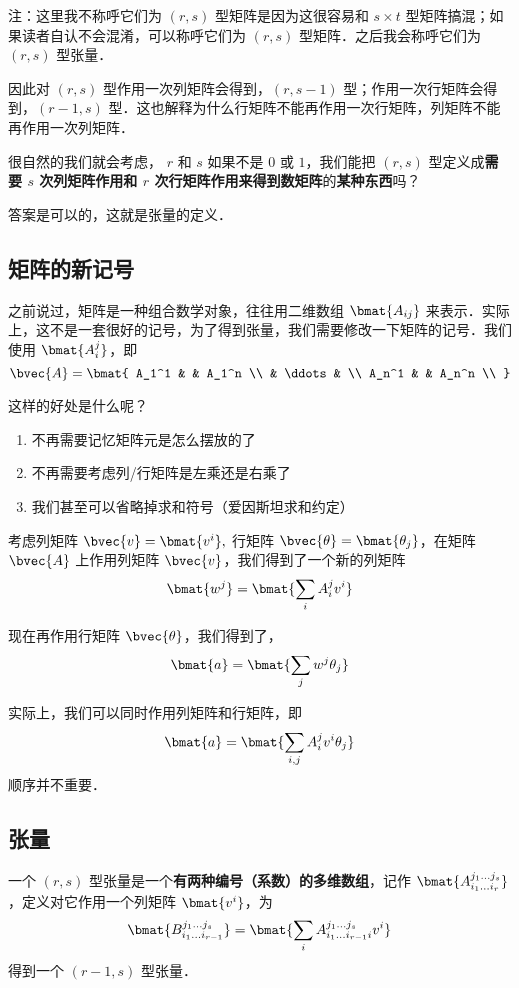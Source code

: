 注：这里我不称呼它们为 $(r, s)$ 型矩阵是因为这很容易和 $s \times t$ 型矩阵搞混；如果读者自认不会混淆，可以称呼它们为 $(r, s)$ 型矩阵．之后我会称呼它们为$(r, s)$ 型张量．

因此对 $(r, s)$ 型作用一次列矩阵会得到，$(r, s - 1)$ 型；作用一次行矩阵会得到，$(r - 1, s)$ 型．这也解释为什么行矩阵不能再作用一次行矩阵，列矩阵不能再作用一次列矩阵．

很自然的我们就会考虑， $r$ 和 $s$ 如果不是 $0$ 或 $1$，我们能把 $(r, s)$ 型定义成\textbf{需要 $s$ 次列矩阵作用和 $r$ 次行矩阵作用来得到数矩阵}的\textbf{某种东西}吗？

答案是可以的，这就是张量的定义．

\subsection{矩阵的新记号}

之前说过，矩阵是一种组合数学对象，往往用二维数组 $\bmat{A_{i j}}$ 来表示．实际上，这不是一套很好的记号，为了得到张量，我们需要修改一下矩阵的记号．我们使用 $\bmat{A_i^j}$，即
$$
\bvec{A} = \bmat{
A_1^1 &  & A_1^n \\
 & \ddots & \\
A_n^1 &  & A_n^n \\
}
$$

这样的好处是什么呢？
\begin{enumerate}
\item 不再需要记忆矩阵元是怎么摆放的了
\item 不再需要考虑列/行矩阵是左乘还是右乘了
\item 我们甚至可以省略掉求和符号（爱因斯坦求和约定）
\end{enumerate}


考虑列矩阵 $\bvec{v} = \bmat{v^i},$ 行矩阵 $\bvec{\theta} = \bmat{\theta_j}$，在矩阵 $\bvec{A}$ 上作用列矩阵 $\bvec{v}$，我们得到了一个新的列矩阵
$$
\bmat{w^j} = \bmat{\sum_i A_i^j v^i}
$$

现在再作用行矩阵 $\bvec{\theta}$，我们得到了，
$$
\bmat{a} = \bmat{\sum_j w^j \theta_j}
$$

实际上，我们可以同时作用列矩阵和行矩阵，即
$$
\bmat{a} = \bmat{\sum_{i, j} A_i^j v^i \theta_j}
$$
顺序并不重要．

\subsection{张量}

一个 $(r,s)$ 型张量是一个\textbf{有两种编号（系数）的多维数组}，记作 $\bmat{A_{i_1 \dots i_r}^{j_1 \dots j_s}}$，定义对它作用一个列矩阵 $\bmat{v^{i}}$，为
\begin{equation}\label{TsrFst_eq1}
\bmat{B_{i_1 \dots i_{r - 1}}^{j_1 \dots j_s}} = \bmat{\sum_{i} A_{i_1 \dots i_{r - 1} i}^{j_1 \dots j_s} v^{i}}
\end{equation}
得到一个 $(r - 1,s)$ 型张量．

